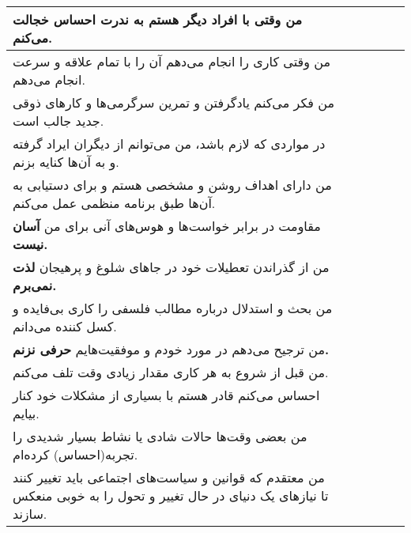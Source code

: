 \documentclass[a4paper,10pt]{article}
\begin{document}
\begin{center}
\begin{tabular}{|p{6cm}|c|c|c|c|c|}
من وقتی با افراد دیگر هستم \textbf{به ندرت} احساس خجالت می‌کنم.& & & & & \\
\hline

من وقتی کاری را انجام می‌دهم آن را با تمام علاقه و سرعت انجام می‌دهم.& & & & & \\
\hline

من فکر می‌کنم یادگرفتن و تمرین سرگرمی‌ها و کارهای ذوقی جدید جالب است.& & & & & \\
\hline

در مواردی که لازم باشد، من می‌توانم از دیگران ایراد گرفته و به آن‌ها کنایه بزنم.& & & & & \\
\hline

من دارای اهداف روشن و مشخصی هستم و برای دستیابی به آن‌ها طبق برنامه منظمی عمل می‌کنم.& & & & & \\
\hline

مقاومت در برابر خواست‌ها و هوس‌های آنی برای من \textbf{آسان نیست.}& & & & & \\
\hline

من از گذراندن تعطیلات خود در جاهای شلوغ و پرهیجان \textbf{لذت نمی‌برم.}& & & & & \\
\hline

من بحث و استدلال درباره مطالب فلسفی را کاری بی‌فایده و کسل کننده می‌دانم.& & & & & \\
\hline

من ترجیح می‌دهم در مورد خودم و موفقیت‌هایم \textbf{حرفی نزنم.}& & & & & \\
\hline

من قبل از شروع به هر کاری مقدار زیادی وقت تلف می‌کنم.& & & & & \\
\hline

احساس می‌کنم قادر هستم با بسیاری از مشکلات خود کنار بیایم.& & & & & \\
\hline

من بعضی وقت‌ها حالات شادی یا نشاط بسیار شدیدی را تجربه(احساس) کرده‌ام.& & & & & \\
\hline

من معتقدم که قوانین و سیاست‌های اجتماعی باید تغییر کنند تا نیاز‌های یک دنیای در حال تغییر و تحول را به خوبی منعکس سازند.& & & & & \\
\hline
\end{tabular}
\end{center}
\end{document}

